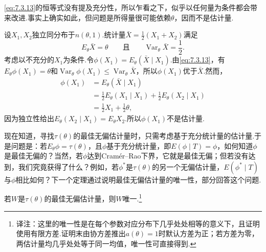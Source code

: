 \eqref{eq:7.3.13}的恒等式没有提及充分性，所以乍看之下，似乎以任何量为条件都会带来改进.事实上确实如此，但问题是所得量很可能依赖$\theta$，因而不是估计量.
\begin{example}[以不充分统计量为条件]\label{ex:7.3.18}
设$X_1,X_2$独立同分布于$n(\theta,1)$.统计量$\bar X=\frac12(X_1+X_2)$满足
$$E_\theta\bar X=\theta\qquad\text{且}\qquad\operatorname{Var}_\theta\bar X=\frac12.$$
考虑以不充分的$X_1$为条件.令$\phi(X_1)=E_\theta(\bar X\mid X_1)$.由\eqref{eq:7.3.13}，有$E_\theta\phi(X_1)=\theta$和$\operatorname{Var}_\theta\phi(X_1)\le\operatorname{Var}_\theta\bar X$，所以$\phi(X_1)$优于$\bar X$.然而，
\begin{align*}
\phi(X_1)&=E_\theta(\bar X\mid X_1)\\
&=\frac12E_\theta(X_1\mid X_1)+\frac12E_\theta(X_2\mid X_1)\\
&=\frac12X_1+\frac12\theta,
\end{align*}
因为独立性给出$E_\theta(X_2\mid X_1)=E_\theta X_2$.所以$\phi(X_1)$不是估计量.
\end{example}
现在知道，寻找$\tau(\theta)$的最佳无偏估计量时，只需考虑基于充分统计量的估计量.于是问题是：若$E_\theta\phi=\tau(\theta)$，且$\phi$基于充分统计量，即$E(\phi\mid T)=\phi$，如何知道$\phi$是最佳无偏的？当然，若$\phi$达到Cramér--Rao下界，它就是最佳无偏；但若没有达到，我们究竟获得了什么？例如，若$\phi^*$是$\tau(\theta)$的另一个无偏估计量，$E(\phi^*\mid T)$与$\phi$相比如何？下一个定理通过说明最佳无偏估计量的唯一性，部分回答这个问题.
\begin{theorem}\label{thm:7.3.19}
若$W$是$\tau(\theta)$的最佳无偏估计量，则$W$唯一.\footnote{译注：这里的唯一性是在每个参数对应分布下几乎处处相等的意义下，且证明使用有限方差.证明末由协方差推出$a(\theta)=1$时默认方差为正；若方差为零，两估计量均几乎处处等于同一均值，唯一性可直接得到.}
\end{theorem}
